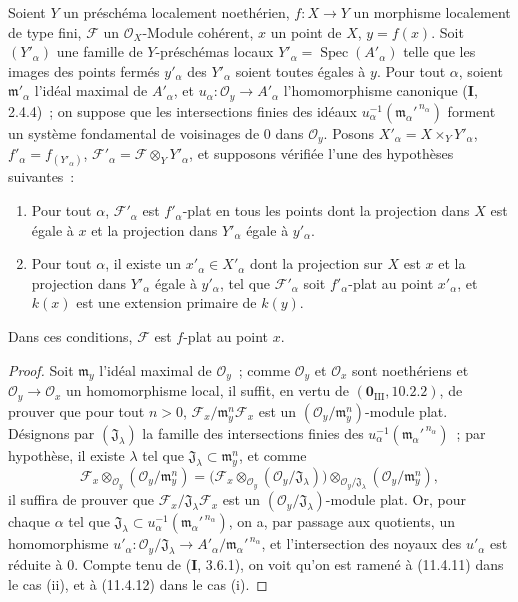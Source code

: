 \begin{theorem}[11.5.1]
\label{IV.11.5.1-fr}
Soient $Y$ un préschéma localement noethérien, $f:X\to Y$ un morphisme
localement de type fini, $\mathcal F$ un $\mathcal O_X$-Module cohérent, $x$ un
point de $X$, $y=f(x)$. Soit $(Y'_\alpha)$ une famille de $Y$-préschémas locaux
$Y'_\alpha=\operatorname{Spec}(A'_\alpha)$ telle que les images des points
fermés $y'_\alpha$ des $Y'_\alpha$ soient toutes égales à $y$. Pour tout
$\alpha$, soient $\mathfrak m'_\alpha$ l'idéal maximal de $A'_\alpha$, et
$u_\alpha:\mathcal O_y\to A'_\alpha$ l'homomorphisme canonique
(\textbf I, 2.4.4)~; on suppose que les intersections finies des idéaux
$u_\alpha^{-1}(\mathfrak m_\alpha'^{\,n_\alpha})$ forment un système fondamental
de voisinages de $0$ dans $\mathcal O_y$. Posons
$X'_\alpha=X\times_Y Y'_\alpha$, $f'_\alpha=f_{(Y'_\alpha)}$,
$\mathcal F'_\alpha=\mathcal F\otimes_Y Y'_\alpha$, et supposons vérifiée l'une
des hypothèses suivantes~:
\begin{enumerate}[label=(\roman*)]
  \item Pour tout $\alpha$, $\mathcal F'_\alpha$ est $f'_\alpha$-plat en tous
  les points dont la projection dans $X$ est égale à $x$ et la projection dans
  $Y'_\alpha$ égale à $y'_\alpha$.
  \item Pour tout $\alpha$, il existe un $x'_\alpha\in X'_\alpha$ dont la
  projection sur $X$ est $x$ et la projection dans $Y'_\alpha$ égale à
  $y'_\alpha$, tel que $\mathcal F'_\alpha$ soit $f'_\alpha$-plat au point
  $x'_\alpha$, et $k(x)$ est une extension primaire de $k(y)$.
\end{enumerate}
Dans ces conditions, $\mathcal F$ est $f$-plat au point $x$.
\end{theorem}

\begin{proof}
Soit $\mathfrak m_y$ l'idéal maximal de $\mathcal O_y$~; comme $\mathcal O_y$
et $\mathcal O_x$ sont noethériens et $\mathcal O_y\to\mathcal O_x$ un
homomorphisme local, il suffit, en vertu de
$(\mathbf 0_{\mathrm{III}},10.2.2)$, de prouver que pour tout $n>0$,
$\mathcal F_x/\mathfrak m_y^n\mathcal F_x$ est un
$(\mathcal O_y/\mathfrak m_y^n)$-module plat. Désignons par
$(\mathfrak J_\lambda)$ la famille des intersections finies des
$u_\alpha^{-1}(\mathfrak m_\alpha'^{\,n_\alpha})$~; par hypothèse, il existe
$\lambda$ tel que $\mathfrak J_\lambda\subset\mathfrak m_y^n$, et comme
\[
\mathcal F_x\otimes_{\mathcal O_y}(\mathcal O_y/\mathfrak m_y^n)
=\bigl(\mathcal F_x\otimes_{\mathcal O_y}(\mathcal O_y/\mathfrak J_\lambda)\bigr)
 \otimes_{\mathcal O_y/\mathfrak J_\lambda}(\mathcal O_y/\mathfrak m_y^n),
\]
il suffira de prouver que $\mathcal F_x/\mathfrak J_\lambda\mathcal F_x$ est un
$(\mathcal O_y/\mathfrak J_\lambda)$-module plat. Or, pour chaque $\alpha$ tel
que $\mathfrak J_\lambda\subset u_\alpha^{-1}(\mathfrak m_\alpha'^{\,n_\alpha})$,
on a, par passage aux quotients, un homomorphisme
$u'_\alpha:\mathcal O_y/\mathfrak J_\lambda\to
A'_\alpha/\mathfrak m_\alpha'^{\,n_\alpha}$, et l'intersection des noyaux des
$u'_\alpha$ est réduite à $0$. Compte tenu de (\textbf I, 3.6.1), on voit qu'on
est ramené à (11.4.11) dans le cas (ii), et à (11.4.12) dans le cas (i).
\end{proof}

